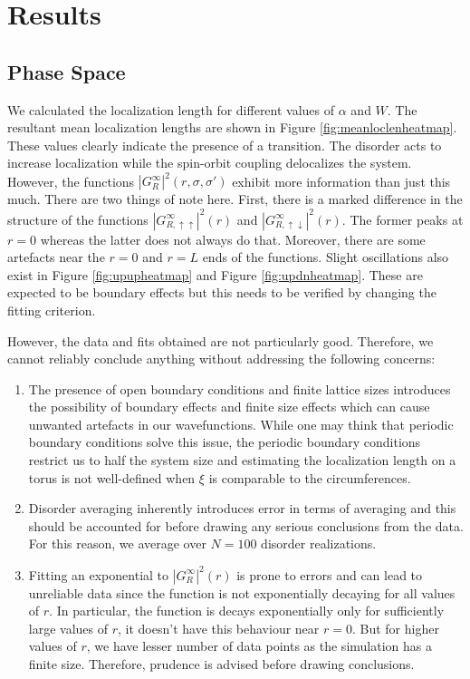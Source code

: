 \documentclass[twocolumn]{article}
\begin{document}
\section{Results}
\subsection{Phase Space}
We calculated the localization length for different values of
$\alpha$ and $W$. The resultant mean localization lengths are shown
in Figure \ref{fig:meanloclenheatmap}. These values clearly
indicate the presence of a transition. The disorder acts to
increase localization while the spin-orbit coupling delocalizes
the system. However, the functions $|G_R^\infty|^2(r, \sigma, \sigma')$
exhibit more information than just this much. There are two things
of note here. First, there is a marked difference in the structure
of the functions $|G_{R,\uparrow\uparrow}^\infty|^2(r)$ and
$|G_{R,\uparrow\downarrow}^\infty|^2(r)$. The former peaks at
$r = 0$ whereas the latter does not always do that. 
Moreover, there are some artefacts near the $r = 0$ and $r = L$
ends of the functions. Slight oscillations also exist in Figure
\ref{fig:upupheatmap} and Figure \ref{fig:updnheatmap}. These
are expected to be boundary effects but this needs to be verified
by changing the fitting criterion.

However, the data and fits obtained are not particularly
good. Therefore, we cannot reliably conclude anything
without addressing the following concerns: 
\begin{enumerate}
    \item The presence of open boundary conditions and
        finite lattice sizes introduces the possibility of
        boundary effects and finite size effects which can cause
        unwanted artefacts in our wavefunctions. While one may
        think that periodic boundary conditions solve this
        issue, the periodic boundary conditions restrict us
        to half the system size and estimating the localization
        length on a torus is not well-defined when $\xi$ is
        comparable to the circumferences.

    \item Disorder averaging inherently introduces error in
        terms of averaging and this should be accounted for
        before drawing any serious conclusions from the data.
        For this reason, we average over $N = 100$ disorder
        realizations.
    
    \item Fitting an exponential to $|G_R^\infty|^2(r)$ is
        prone to errors and can lead to unreliable data since
        the function is not exponentially decaying for all
        values of $r$. In particular, the function is decays
        exponentially only for sufficiently large values of $r$,
        it doesn't have this behaviour near $r = 0$. But for
        higher values of $r$, we have lesser number of data
        points as the simulation has a finite size. Therefore,
        prudence is advised before drawing conclusions.    
\end{enumerate}
\end{document}
